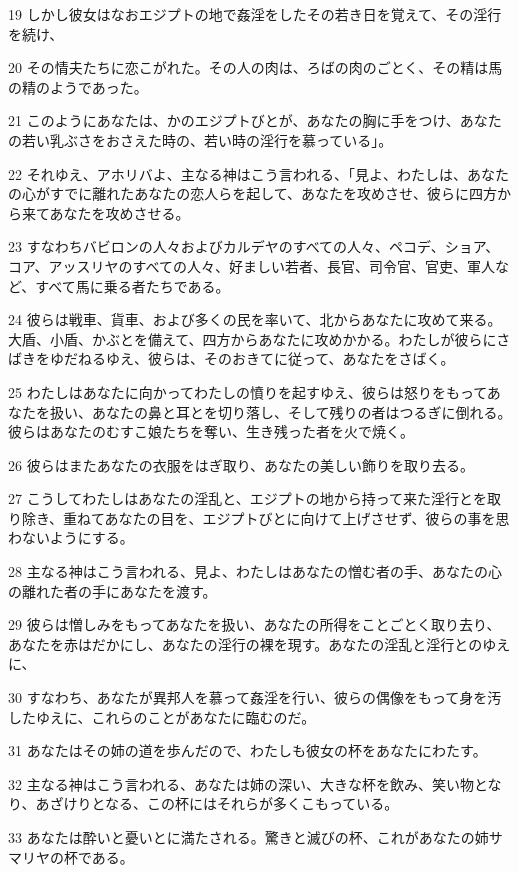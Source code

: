 \par 19 しかし彼女はなおエジプトの地で姦淫をしたその若き日を覚えて、その淫行を続け、
\par 20 その情夫たちに恋こがれた。その人の肉は、ろばの肉のごとく、その精は馬の精のようであった。
\par 21 このようにあなたは、かのエジプトびとが、あなたの胸に手をつけ、あなたの若い乳ぶさをおさえた時の、若い時の淫行を慕っている」。
\par 22 それゆえ、アホリバよ、主なる神はこう言われる、「見よ、わたしは、あなたの心がすでに離れたあなたの恋人らを起して、あなたを攻めさせ、彼らに四方から来てあなたを攻めさせる。
\par 23 すなわちバビロンの人々およびカルデヤのすべての人々、ペコデ、ショア、コア、アッスリヤのすべての人々、好ましい若者、長官、司令官、官吏、軍人など、すべて馬に乗る者たちである。
\par 24 彼らは戦車、貨車、および多くの民を率いて、北からあなたに攻めて来る。大盾、小盾、かぶとを備えて、四方からあなたに攻めかかる。わたしが彼らにさばきをゆだねるゆえ、彼らは、そのおきてに従って、あなたをさばく。
\par 25 わたしはあなたに向かってわたしの憤りを起すゆえ、彼らは怒りをもってあなたを扱い、あなたの鼻と耳とを切り落し、そして残りの者はつるぎに倒れる。彼らはあなたのむすこ娘たちを奪い、生き残った者を火で焼く。
\par 26 彼らはまたあなたの衣服をはぎ取り、あなたの美しい飾りを取り去る。
\par 27 こうしてわたしはあなたの淫乱と、エジプトの地から持って来た淫行とを取り除き、重ねてあなたの目を、エジプトびとに向けて上げさせず、彼らの事を思わないようにする。
\par 28 主なる神はこう言われる、見よ、わたしはあなたの憎む者の手、あなたの心の離れた者の手にあなたを渡す。
\par 29 彼らは憎しみをもってあなたを扱い、あなたの所得をことごとく取り去り、あなたを赤はだかにし、あなたの淫行の裸を現す。あなたの淫乱と淫行とのゆえに、
\par 30 すなわち、あなたが異邦人を慕って姦淫を行い、彼らの偶像をもって身を汚したゆえに、これらのことがあなたに臨むのだ。
\par 31 あなたはその姉の道を歩んだので、わたしも彼女の杯をあなたにわたす。
\par 32 主なる神はこう言われる、あなたは姉の深い、大きな杯を飲み、笑い物となり、あざけりとなる、この杯にはそれらが多くこもっている。
\par 33 あなたは酔いと憂いとに満たされる。驚きと滅びの杯、これがあなたの姉サマリヤの杯である。
